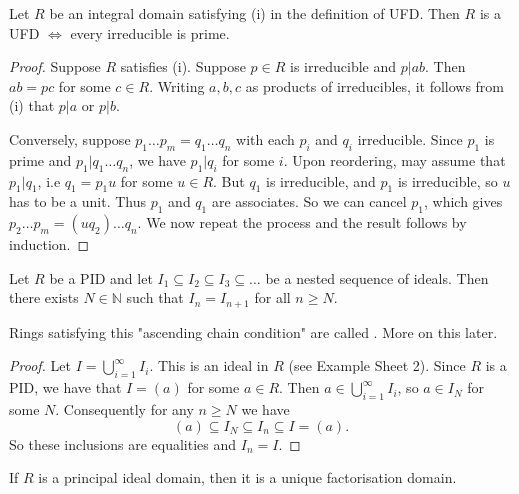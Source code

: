 \documentclass[egregdoesnotlikesansseriftitles,a4paper]{scrartcl}
\begin{document}
\begin{proposition}
       Let $R$ be an integral domain satisfying (i) in the definition of UFD. Then $R$ is a UFD $\iff$ every irreducible is prime.
\end{proposition}
\begin{proof}
       Suppose $R$ satisfies (i). Suppose $p \in R$ is irreducible and $p|ab$. Then $ab=pc $ for some $c \in R$. Writing $a,b,c$ as products of irreducibles, it follows from (i) that $p|a$ or $p|b$.

       Conversely, suppose $p_1 \ldots p_{m}=q_1 \ldots q_{n}$ with each $p_i$ and $q_i$ irreducible. Since $p_1 $ is prime and $p_1 | q_1 \ldots q_n$, we have $p_1 |q_i$ for some $i$. Upon reordering, may assume that $p_1 | q_1 $, i.e $q_1 =p_1 u$ for some $u \in R$. But $q_1 $ is irreducible, and $p_1 $ is irreducible, so $u$ has to be a unit. Thus $p_1 $ and $q_1 $ are associates. So we can cancel $p_1 $, which gives $p_2 \ldots p_m= (uq_2 )\ldots q_n$. We now repeat the process and the result follows by induction.
\end{proof}
\begin{lemma}\label{PIDsarenoetherian}
       Let $R$ be a PID and let $I_1 \subseteq I_2 \subseteq I_3 \subseteq \ldots$ be a nested sequence of ideals. Then there exists $N \in \mathbb{N}$ such that $I_{n}=I_{n+1}$ for all $n \geq N$.
       \begin{remark}
              Rings satisfying this "ascending chain condition" are called . More on this later.
       \end{remark}
\end{lemma}
\begin{proof}
       Let $I=\bigcup_{i=1}^{\infty}I_{i}$. This is an ideal in $R$ (see Example Sheet 2). Since $R$ is a PID, we have that $I=(a)$ for some $a \in R$. Then $a \in \bigcup_{i=1}^{\infty}I_{i}$, so $a \in I_{N}$ for some $N$. Consequently for any $n \geq N$ we have \[
       (a) \subseteq I_{N} \subseteq I_{n} \subseteq I= (a)
       .\] So these inclusions are equalities and $I_{n}=I$.
\end{proof}
\begin{theorem}
       If $R$ is a principal ideal domain, then it is a unique factorisation domain.
\end{theorem}
\end{document}
